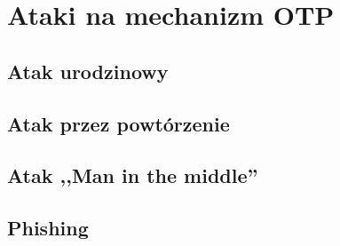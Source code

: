 \chapter{Ataki na mechanizm OTP}

\section{Atak urodzinowy}
\section{Atak przez powtórzenie}
\section{Atak ,,Man in the middle''}
\section{Phishing}